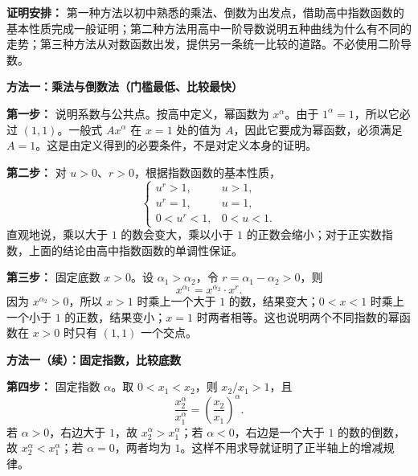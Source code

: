 \clearpage
\begin{proofbox}
  \textbf{证明安排：} 第一种方法以初中熟悉的乘法、倒数为出发点，借助高中指数函数的基本性质完成一般证明；第二种方法用高中一阶导数说明五种曲线为什么有不同的走势；第三种方法从对数函数出发，提供另一条统一比较的道路。不必使用二阶导数。

  \medskip
  \textbf{\textcolor{CProof}{方法一：乘法与倒数法（门槛最低、比较最快）}}



  \textbf{第一步：} 说明系数与公共点。按高中定义，幂函数为 $x^\alpha$。由于 $1^\alpha=1$，所以它必过 $(1,1)$。一般式 $Ax^\alpha$ 在 $x=1$ 处的值为 $A$，因此它要成为幂函数，必须满足 $A=1$。这是由定义得到的必要条件，不是对定义本身的证明。

  \textbf{第二步：} 对 $u>0$、$r>0$，根据指数函数的基本性质，
  \[
  \begin{cases}
  u^r>1,&u>1,\\
  u^r=1,&u=1,\\
  0<u^r<1,&0<u<1.
  \end{cases}
  \]
  直观地说，乘以大于 $1$ 的数会变大，乘以小于 $1$ 的正数会缩小；对于正实数指数，上面的结论由高中指数函数的单调性保证。

  \textbf{第三步：} 固定底数 $x>0$。设 $\alpha_1>\alpha_2$，令 $r=\alpha_1-\alpha_2>0$，则
  \[
    x^{\alpha_1}=x^{\alpha_2}\cdot x^r.
  \]
  因为 $x^{\alpha_2}>0$，所以 $x>1$ 时乘上一个大于 $1$ 的数，结果变大；$0<x<1$ 时乘上一个小于 $1$ 的正数，结果变小；$x=1$ 时两者相等。这也说明两个不同指数的幂函数在 $x>0$ 时只有 $(1,1)$ 一个交点。

  \end{proofbox}\clearpage\begin{proofbox}\textbf{\textcolor{CProof}{方法一（续）：固定指数，比较底数}}

\textbf{第四步：} 固定指数 $\alpha$。取 $0<x_1<x_2$，则 $x_2/x_1>1$，且
  \[
     \frac{x_2^\alpha}{x_1^\alpha}
     =\left(\frac{x_2}{x_1}\right)^\alpha.
  \]
  若 $\alpha>0$，右边大于 $1$，故 $x_2^\alpha>x_1^\alpha$；若 $\alpha<0$，右边是一个大于 $1$ 的数的倒数，故 $x_2^\alpha<x_1^\alpha$；若 $\alpha=0$，两者均为 $1$。这样不用求导就证明了正半轴上的增减规律。

  \medskip
  
\end{proofbox}
\clearpage
